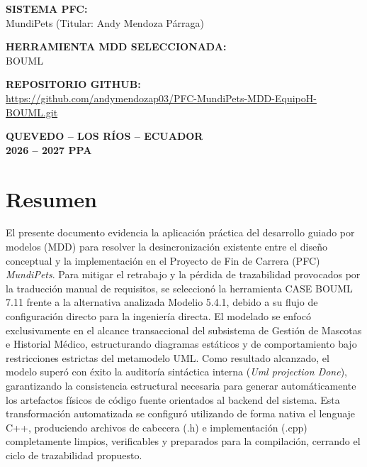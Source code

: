\documentclass[journal,onecolumn]{IEEEtran}
\begin{document}
\begin{titlepage}
		\vspace{0.4cm}
		{\normalsize\bfseries SISTEMA PFC:}\\[4pt]
		{\normalsize MundiPets (Titular: Andy Mendoza Párraga)}
		
		\vspace{0.4cm}
		{\normalsize\bfseries HERRAMIENTA MDD SELECCIONADA:}\\[4pt]
		{\normalsize BOUML}
		
		\vspace{0.4cm}
		\textbf{REPOSITORIO GITHUB:}\\[4pt]
		\url{https://github.com/andymendozap03/PFC-MundiPets-MDD-EquipoH-BOUML.git}
		
		\vspace{0.8cm}
		{\normalsize\bfseries QUEVEDO -- LOS RÍOS -- ECUADOR}\\[4pt]
		{\normalsize\bfseries 2026 -- 2027 PPA}
		
	\end{titlepage}
	
	\clearpage
	\begingroup
	\renewcommand{\clearpage}{} %
	\tableofcontents
	\endgroup
	\clearpage
	
	\section{Resumen}
	El presente documento evidencia la aplicación práctica del desarrollo guiado por modelos (MDD) para resolver la desincronización existente entre el diseño conceptual y la implementación en el Proyecto de Fin de Carrera (PFC) \textit{MundiPets}. Para mitigar el retrabajo y la pérdida de trazabilidad provocados por la traducción manual de requisitos, se seleccionó la herramienta CASE BOUML 7.11 frente a la alternativa analizada Modelio 5.4.1, debido a su flujo de configuración directo para la ingeniería directa. El modelado se enfocó exclusivamente en el alcance transaccional del subsistema de Gestión de Mascotas e Historial Médico, estructurando diagramas estáticos y de comportamiento bajo restricciones estrictas del metamodelo UML. Como resultado alcanzado, el modelo superó con éxito la auditoría sintáctica interna (\textit{Uml projection Done}), garantizando la consistencia estructural necesaria para generar automáticamente los artefactos físicos de código fuente orientados al backend del sistema. Esta transformación automatizada se configuró utilizando de forma nativa el lenguaje C++, produciendo archivos de cabecera (.h) e implementación (.cpp) completamente limpios, verificables y preparados para la compilación, cerrando el ciclo de trazabilidad propuesto.
	
\end{document}
